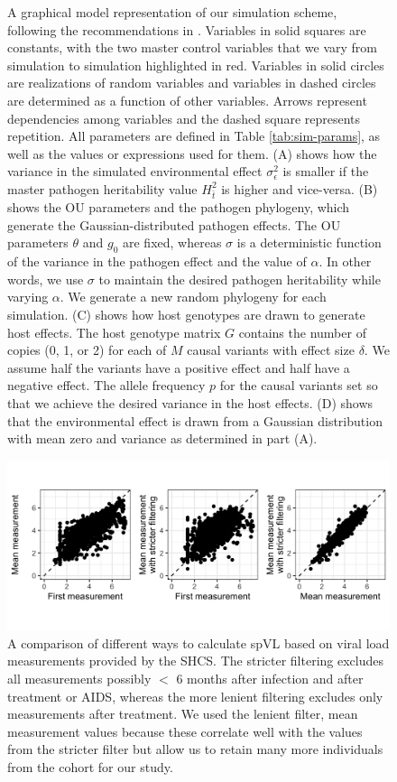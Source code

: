 \documentclass[11pt]{article}
\begin{document}
\begin{doublespace}
\begin{figure}[H]
\begin{tikzpicture}
	\end{tikzpicture}
	\caption{A graphical model representation of our simulation scheme, following the recommendations in \cite{Hohna2014}. Variables in solid squares are constants, with the two master control variables that we vary from simulation to simulation highlighted in red. Variables in solid circles are realizations of random variables and variables in dashed circles are determined as a function of other variables. Arrows represent dependencies among variables and the dashed square represents repetition. All parameters are defined in Table \ref{tab:sim-params}, as well as the values or expressions used for them. (A) shows how the variance in the simulated environmental effect $\sigma^2_{\epsilon}$ is smaller if the master pathogen heritability value $H^2_{\bar{t}}$ is higher and vice-versa. (B) shows the OU parameters and the pathogen phylogeny, which generate the Gaussian-distributed pathogen effects. The OU parameters $\theta$ and $g_0$ are fixed, whereas $\sigma$ is a deterministic function of the variance in the pathogen effect and the value of $\alpha$. In other words, we use $\sigma$ to maintain the desired pathogen heritability while varying $\alpha$. We generate a new random phylogeny for each simulation. (C) shows how host genotypes are drawn to generate host effects. The host genotype matrix $G$ contains the number of copies (0, 1, or 2) for each of $M$ causal variants with effect size $\delta$. We assume half the variants have a positive effect and half have a negative effect. The allele frequency $p$ for the causal variants set so that we achieve the desired variance in the host effects. (D) shows that the environmental effect is drawn from a Gaussian distribution with mean zero and variance as determined in part (A).}
	\label{fig:sim-design}
\end{figure}

\begin{figure}[H]
\begin{center}
\includegraphics[width = 0.7\linewidth]{figures/spvl_calculation_comparison.png}
	\caption{A comparison of different ways to calculate spVL based on viral load measurements provided by the SHCS. The stricter filtering excludes all measurements possibly $<$ 6 months after infection and after treatment or AIDS, whereas the more lenient filtering excludes only measurements after treatment. We used the lenient filter, mean measurement values because these correlate well with the values from the stricter filter but allow us to retain many more individuals from the cohort for our study.}
	\label{fig:spvl-calc-comparison}
	\end{center}
\end{figure}


\end{doublespace}
\end{document}
